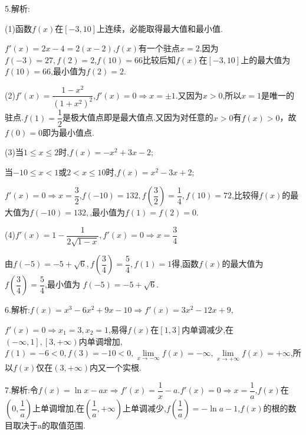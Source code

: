5.解析:

(1)函数$f(x)$在$\left[ { - 3,10} \right]$上连续，必能取得最大值和最小值.

$f'\left( x \right) = 2x - 4 = 2\left( {x - 2} \right)$,$f\left( x \right)$有一个驻点$x = 2$.因为$f\left( { - 3} \right) = 27,f\left( 2 \right) = 2$,$f\left( {10} \right) = 66$比较后知$f(x)$在$\left[ { - 3,10} \right]$上的最大值为$f\left( {10} \right) = 66$,最小值为$f\left( 2 \right) = 2$.

(2)$f'\left( x \right) = \dfrac{{1 - {x^2}}}{{{{\left( {1 + {x^2}} \right)}^2}}}$,$f'\left( x \right) = 0 \Rightarrow x =  \pm 1$.又因为$x > 0$,所以$x = 1$是唯一的驻点.$f\left( 1 \right) = \dfrac{1}{2}$是极大值点即是最大值点.又因为对任意的$x > 0$有$f\left( x \right) > 0$，故$f\left( 0 \right) = 0$即为最小值点.

(3)当$1 \le x \le 2$时,$f\left( x \right) =  - {x^2} + 3x - 2$;

当$ - 10 \le x < 1$或$2 < x \le 10$时,$f\left( x \right) = {x^2} - 3x + 2$;

$f'\left( x \right) = 0 \Rightarrow x = \dfrac{3}{2}$,$f\left( { - 10} \right) = 132,f\left( {\dfrac{3}{2}} \right) = \dfrac{1}{4},f\left( {10} \right) = 72$,比较得$f\left( x \right)$的最大值为$f\left( { - 10} \right) = 132,$,最小值为$f\left( 1 \right) = f\left( 2 \right) = 0$.

(4)$f'\left( x \right) = 1 - \dfrac{1}{{2\sqrt {1 - x} }},f'\left( x \right) = 0 \Rightarrow x = \dfrac{3}{4}$

由$f\left( { - 5} \right) =  - 5 + \sqrt 6 ,f\left( {\dfrac{3}{4}} \right) = \dfrac{5}{4},f\left( 1 \right) = 1$得,函数$f\left( x \right)$的最大值为$f\left( {\dfrac{3}{4}} \right) = \dfrac{5}{4}$,最小值为
$f\left( { - 5} \right) =  - 5 + \sqrt 6 $.

6.解析:$f\left( x \right) = {x^3} - 6{x^2} + 9x - 10 \Rightarrow f'\left( x \right) = 3{x^2} - 12x + 9,$

$f'\left( x \right) = 0 \Rightarrow {x_1} = 3,{x_2} = 1$,易得$f\left( x \right)$在$\left[ {1,3} \right]$内单调减少,在$\left( { - \infty ,1} \right],\left[ {3, + \infty } \right)$内单调增加,$f\left( 1 \right) =  - 6 < 0,f\left( 3 \right) =  - 10 < 0,\mathop {\lim }\limits_{x \to  - \infty } f\left( x \right) =  - \infty ,\lim\limits_{x \to +\infty}  f\left( x \right) =  + \infty $,所以$f\left( x \right)$仅在$\left( {3, + \infty } \right)$内又一个实根.

7.解析:令$f\left( x \right) = \ln x - ax \Rightarrow f'\left( x \right) = \dfrac{1}{x} - a.$$f'\left( x \right) = 0 \Rightarrow x = \dfrac{1}{a}$,$f\left( x \right)$在$\left( {0,\dfrac{1}{a}} \right)$上单调增加,在$\left( {\dfrac{1}{a}, + \infty } \right)$上单调减少,$f\left( {\dfrac{1}{a}} \right) =  - \ln a - 1$,$f\left( x \right)$的根的数目取决于a的取值范围.

